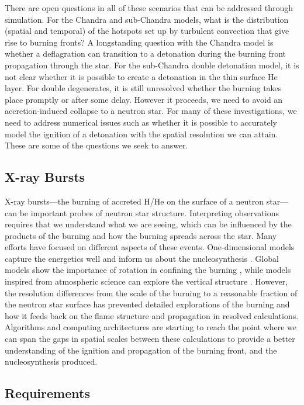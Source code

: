 \documentclass[a4paper]{jpconf}
\begin{document}
There are open questions in all of these scenarios that can be
addressed through simulation.  For the Chandra and sub-Chandra models,
what is the distribution (spatial and temporal) of the hotspots set up
by turbulent convection that give rise to burning fronts?  A
longstanding question with the Chandra model is whether a deflagration
can transition to a detonation during the burning front propagation
through the star.  For the sub-Chandra double detonation model, it is
not clear whether it is possible to create a detonation in the thin
surface He layer.  For double degenerates, it is still unresolved
whether the burning takes place promptly or after some delay.  However
it proceeds, we need to avoid an accretion-induced collapse to a
neutron star.  For many of these investigations, we need to address
numerical issues such as whether it is possible to accurately model
the ignition of a detonation with the spatial resolution we can
attain.  These are some of the questions we seek to answer.

\subsection{X-ray Bursts}

X-ray bursts---the burning of accreted H/He on the surface of a
neutron star---can be important probes of neutron star structure.
Interpreting observations requires that we understand what we are
seeing, which can be influenced by the products of the burning and how
the burning spreads across the star.  Many efforts have focused on
different aspects of these events.  One-dimensional models capture the
energetics well and inform us about the nucleosynthesis
\cite{woosley-xrb}.  Global models show the importance of rotation in
confining the burning \cite{SPIT_ETAL02}, while models inspired from
atmospheric science can explore the vertical structure
\cite{cavecchi:2012}.  However, the resolution differences from the
scale of the burning to a reasonable fraction of the neutron star
surface has prevented detailed explorations of the burning and how it
feeds back on the flame structure and propagation in resolved
calculations.  Algorithms and computing architectures are starting to
reach the point where we can span the gaps in spatial scales between
these calculations to provide a better understanding of the ignition
and propagation of the burning front, and the nucleosynthesis
produced.


\subsection{Requirements}
\end{document}
